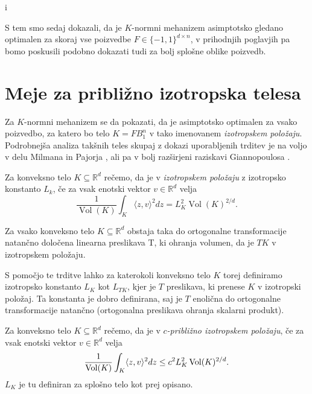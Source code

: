 i\documentclass[mat1]{fmfdelo}
\DeclarePairedDelimiter{\scalar}{\langle}{\rangle}
\newcommand{\R}{\mathbb R}
\DeclareMathOperator{\Vol}{Vol}
\begin{document}
S tem smo sedaj dokazali, da je $K$-normni mehanizem asimptotsko gledano optimalen za skoraj vse poizvedbe $F \in \{-1, 1\}^{d\times n}$, v prihodnjih poglavjih pa bomo poskusili podobno dokazati tudi za bolj splošne oblike poizvedb.

\section{Meje za približno izotropska telesa}

Za $K$-normni mehanizem se da pokazati, da je asimptotsko optimalen za vsako poizvedbo, za katero bo telo $K=FB_1^n$ v tako imenovanem \emph{izotropskem položaju}. Podrobnejša analiza takšnih teles skupaj z dokazi uporabljenih trditev je na voljo v delu Milmana in Pajorja \cite{milman}, ali pa v bolj razširjeni raziskavi Giannopoulosa \cite{geomisotrop}.

\begin{definicija}
    Za konveksno telo $K \subseteq \R^d$ rečemo, da je v \emph{izotropskem položaju} z izotropsko konstanto $L_k$, če za vsak enotski vektor $v \in \R^d$ velja
    \begin{equation*}
        \frac{1}{\Vol(K)} \int_K \langle z,v\rangle^2 dz = L_K^2 \Vol(K)^{2/d}.
    \end{equation*}
\end{definicija}

\begin{trditev}
Za vsako konveksno telo $K \subseteq \R^d$ obstaja taka do ortogonalne transformacije natančno določena linearna preslikava T, ki ohranja volumen, da je $TK$ v izotropskem položaju.
\end{trditev}

S pomočjo te trditve lahko za katerokoli konveksno telo $K$ torej definiramo izotropsko konstanto $L_K$ kot $L_{TK}$, kjer je $T$ preslikava, ki prenese $K$ v izotropski položaj. Ta konstanta je dobro definirana, saj je $T$ enolična do ortogonalne transformacije natančno (ortogonalna preslikava ohranja skalarni produkt).

\begin{definicija}
     Za konveksno telo $K \subseteq \R^d$ rečemo, da je v \emph{$c$-približno izotropskem položaju}, če za vsak enotski vektor $v \in \R^d$ velja
    \begin{equation*}
        \frac{1}{\Vol(K)} \int_K \scalar{z,v}^2 dz \leq c^2 L_K^2 \Vol(K)^{2/d}.
    \end{equation*}
    $L_K$ je tu definiran za splošno telo kot prej opisano.
\end{definicija}
\end{document}
